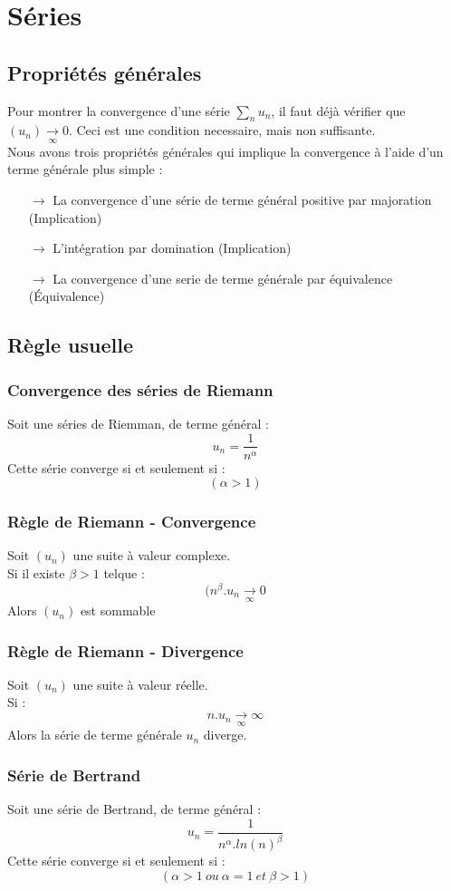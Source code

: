\chapter{Séries}
\section{Propriétés générales}
Pour montrer la convergence d'une série $\underset{n} \sum u_n$, il faut déjà vérifier que $(u_n) \underset{\infty}\rightarrow 0$. Ceci est une condition necessaire, mais non suffisante.\\
Nous avons trois propriétés générales qui implique la convergence à l'aide d'un terme générale plus simple :
\begin{itemize}
 \item[$\rightarrow$] La convergence d'une série de terme général positive par majoration (Implication)
 \item[$\rightarrow$] L'intégration par domination (Implication)
 \item[$\rightarrow$] La convergence d'une serie de terme générale par équivalence (Équivalence)
\end{itemize}
\section{Règle usuelle}
\subsection{Convergence des séries de Riemann}
Soit une séries de Riemman, de terme général :
$$u_n  = \dfrac{1}{n^{\alpha}}$$
Cette série converge si et seulement si :
$$(\alpha > 1)$$
\subsection{Règle de Riemann - Convergence}
Soit $(u_n)$ une suite à valeur complexe.\\
Si il existe $\beta > 1$ telque :
$$(n^{\beta}.u_n \underset{\infty}\rightarrow 0$$
Alors $(u_n)$ est sommable
\subsection{Règle de Riemann - Divergence}
Soit $(u_n)$ une suite à valeur réelle.\\
Si : 
$$n.u_n \underset{\infty}\rightarrow \infty $$
Alors la série de terme générale $u_n$ diverge.
\subsection{Série de Bertrand}
Soit une série de Bertrand, de terme général :
$$u_n = \dfrac{1}{n^{\alpha}.ln(n)^{\beta}}$$
Cette série converge si et seulement si : 
$$(\alpha > 1~ ou~ \alpha=1~ et~ \beta>1)$$
